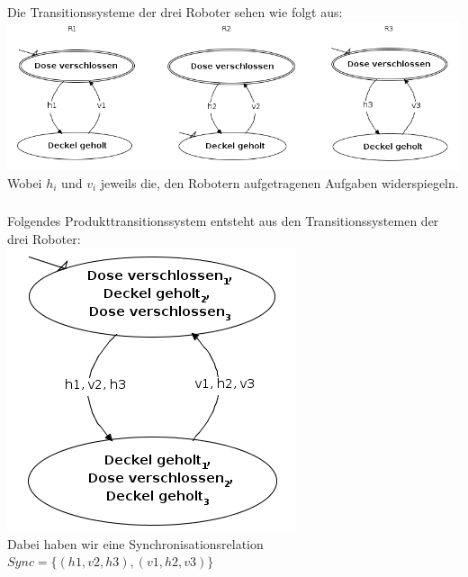 \documentclass[a4paper,12pt]{scrartcl}
\begin{document}
\subsection{}
\subsubsection{}
Die Transitionssysteme der drei Roboter sehen wie folgt aus:\\
\includegraphics[scale=0.5]{roboter_trans.png}\\
Wobei $h_i$ und $v_i$ jeweils die, den Robotern aufgetragenen Aufgaben widerspiegeln.
\subsubsection{}
Folgendes Produkttransitionssystem entsteht aus den Transitionssystemen der drei Roboter:\\
\includegraphics[scale=0.5]{roboter_prod.png}\\
Dabei haben wir eine Synchronisationsrelation $Sync = \{(h1, v2, h3), (v1, h2, v3)\}$
\end{document}
